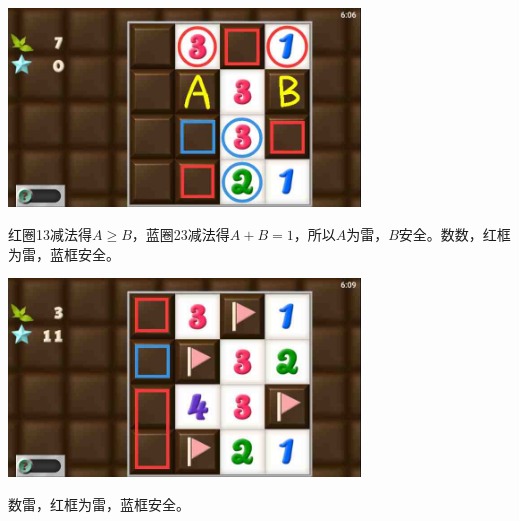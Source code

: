 \subsection{} %
\begin{center}
    \includegraphics[width=0.7\textwidth]{puzzlelow/102-1.jpg}
\end{center}
红圈13减法得$A\ge B$，蓝圈23减法得$A+B=1$，所以$A$为雷，$B$安全。数数，红框为雷，蓝框安全。
\begin{center}
    \includegraphics[width=0.7\textwidth]{puzzlelow/102-2.jpg}
\end{center}
数雷，红框为雷，蓝框安全。

